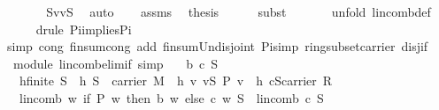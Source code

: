 \begin{isabellebody}
%
\isadelimproof
%
\endisadelimproof
%
\isatagproof
{}\isamarkupfalse%
\ {\isacharminus}\ \isanewline
\ \ \isamarkupfalse%
\ {}{\isacharcolon}\ {\isachardoublequoteopen}S{\isasymunion}{\isacharbraceleft}v{\isacharbraceright}{\isacharequal}{\isacharbraceleft}v{\isacharbraceright}{\isasymunion}S{\isachardoublequoteclose}\ \isamarkupfalse%
\ auto\isanewline
\ \ \isamarkupfalse%
\ assms\ \isamarkupfalse%
\ {\isacharquery}thesis\isanewline
\ \ \ \ \isamarkupfalse%
\ {\isacharparenleft}subst\ {}{\isacharparenright}\isanewline
\ \ \ \ \isamarkupfalse%
\ {\isacharparenleft}unfold\ lincomb{\isacharunderscore}def{\isacharparenright}\isanewline
\ \ \ \ \isamarkupfalse%
\ {\isacharparenleft}drule\ Pi{\isacharunderscore}implies{\isacharunderscore}Pi{}{\isacharparenright}{\isacharplus}\isanewline
\ \ \ \ \isamarkupfalse%
\ {\isacharparenleft}simp\ cong{\isacharcolon}\ finsum{\isacharunderscore}cong{}\ add{\isacharcolon}\ finsum{\isacharunderscore}Un{\isacharunderscore}disjoint\ Pi{\isacharunderscore}simp\ ring{\isacharunderscore}subset{\isacharunderscore}carrier\ disj{\isacharunderscore}if{\isacharparenright}\isanewline
{}\isamarkupfalse%
%
\endisatagproof
{\isafoldproof}%
%
\isadelimproof
\isanewline
%
\endisadelimproof
\isanewline
{}\isamarkupfalse%
\ {\isacharparenleft}\ module{\isacharparenright}\ lincomb{\isacharunderscore}elim{\isacharunderscore}if\ {\isacharbrackleft}simp{\isacharbrackright}{\isacharcolon}\isanewline
\ \ \ b\ c\ S\isanewline
\ \ \ h{}{\isacharcolon}{\isachardoublequoteopen}finite\ S{\isachardoublequoteclose}\ \ h{}{\isacharcolon}\ {\isachardoublequoteopen}S\ {\isasymsubseteq}\ carrier\ M{\isachardoublequoteclose}\ \ h{}{\isacharcolon}\ {\isachardoublequoteopen}{\isasymAnd}v{\isachardot}\ v{\isasymin}S{\isasymLongrightarrow}\ {\isasymnot}P\ v{\isachardoublequoteclose}\ \ h{}{\isacharcolon}\ {\isachardoublequoteopen}c{\isasymin}S{\isasymrightarrow}carrier\ R{\isachardoublequoteclose}\isanewline
\ \ \ {\isachardoublequoteopen}lincomb\ {\isacharparenleft}{\isasymlambda}w{\isachardot}\ if\ P\ w\ then\ b\ w\ else\ c\ w{\isacharparenright}\ S\ {\isacharequal}\ lincomb\ c\ S{\isachardoublequoteclose}\isanewline
%
\isadelimproof
%
\endisadelimproof
%
\isatagproof
{}\isamarkupfalse%

\end{isabellebody}
